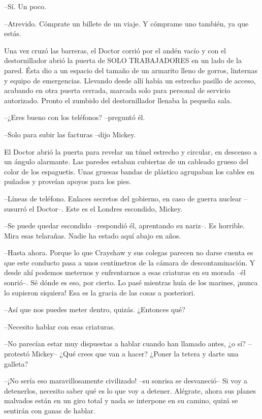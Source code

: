 {--Sí. Un poco.}

{--Atrevido. Cómprate un billete de un viaje. Y cómprame uno también, ya
que estás.}

{Una vez cruzó las barreras, el Doctor corrió por el andén vacío y con
 el destornillador abrió la puerta de SOLO TRABAJADORES en un lado de la
 pared. Ésta dio a un espacio del tamaño de un armarito lleno de gorros,
 linternas y equipo de emergencias. Llevando desde allí había un estrecho
 pasillo de acceso, acabando en otra puerta cerrada, marcada solo para
 personal de servicio autorizado. Pronto el zumbido del destornillador
llenaba la pequeña sala.}

{--¿Eres bueno con los teléfonos? --preguntó él.}

{--Solo para subir las facturas --dijo Mickey.}

{El Doctor abrió la puerta para revelar un túnel estrecho y circular, en
 descenso a un ángulo alarmante. Las paredes estaban cubiertas de un
 cableado grueso del color de los espaguetis. Unas gruesas bandas de
 plástico agrupaban los cables en puñados y proveían apoyos para los
pies.}

{--Líneas de teléfono. Enlaces secretos del gobierno, en caso de guerra
nuclear --susurró el Doctor--. Este es el Londres escondido, Mickey.}

{--Se puede quedar escondido --respondió él, aprentando su nariz--. Es
horrible. Mira esas telarañas. Nadie ha estado aquí abajo en años.}

{--Hasta ahora. Porque lo que Crayshaw y sus colegas parecen no darse
 cuenta es que este conducto pasa a unos centímetros de la cámara de
 descontaminación. Y desde ahí podemos meternos y enfrentarnos a esas
 criaturas en su morada --él sonrió--. Sé dónde es eso, por cierto. Lo
 pasé mientras huía de los marines, ¡nunca lo supieron siquiera! Esa es
la gracia de las cosas a posteriori.}

{--Así que nos puedes meter dentro, quizás. ¿Entonces qué?}

{--Necesito hablar con esas criaturas.}

{--No parecían estar muy dispuestas a hablar cuando han llamado antes,
 ¿o sí? --protestó Mickey-- ¿Qué crees que van a hacer? ¿Poner la tetera
y darte una galleta?}

{--¡No sería eso maravillosamente civilizado! --su sonrisa se
 desvaneció-- Si voy a detenerlos, necesito saber qué es lo que voy a
 detener. Alégrate, ahora sus planes malvados están en un giro total y
nada se interpone en su camino, quizá se sentirán con ganas de hablar.}

